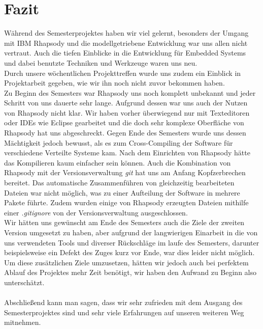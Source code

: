 \chapter{Fazit}

Während des Semesterprojektes haben wir viel gelernt, besonders der Umgang mit IBM Rhapsody und die modellgetriebene Entwicklung war uns allen nicht vertraut. Auch die tiefen Einblicke in die Entwicklung für Embedded Systems und dabei benutzte Techniken und Werkzeuge waren uns neu.\\
Durch unsere wöchentlichen Projekttreffen wurde uns zudem ein Einblick in Projektarbeit gegeben, wie wir ihn noch nicht zuvor bekommen haben.\\
Zu Beginn des Semesters war Rhapsody uns noch komplett unbekannt und jeder Schritt von uns dauerte sehr lange. Aufgrund dessen war uns auch der Nutzen von Rhapsody nicht klar. Wir haben vorher überwiegend nur mit Texteditoren oder IDEs wie Eclipse gearbeitet und die doch sehr komplexe Oberfläche von Rhapsody hat uns abgeschreckt. Gegen Ende des Semesters wurde uns dessen Mächtigkeit jedoch bewusst, als es zum Cross-Compiling der Software für verschiedene Verteilte Systeme kam. Nach dem Einrichten von Rhapsody hätte das Kompilieren kaum einfacher sein können. Auch die Kombination von Rhapsody mit der Versionsverwaltung \textit{git} hat uns am Anfang Kopfzerbrechen bereitet. Das automatische Zusammenführen von gleichzeitig bearbeiteten Dateien war nicht möglich, was zu einer Aufteilung der Software in mehrere Pakete führte. Zudem wurden einige von Rhapsody erzeugten Dateien mithilfe einer \textit{.gitignore} von der Versionsverwaltung ausgeschlossen.\\
Wir hätten uns gewünscht am Ende des Semesters auch die Ziele der zweiten Version umgesetzt zu haben, aber aufgrund der langwierigen Einarbeit in die von uns verwendeten Tools und diverser Rückschläge im laufe des Semesters, darunter beispielsweise ein Defekt des Zuges kurz vor Ende, war dies leider nicht möglich. Um diese zusätzlichen Ziele umzusetzen, hätten wir jedoch auch bei perfektem Ablauf des Projektes mehr Zeit benötigt, wir haben den Aufwand zu Beginn also unterschätzt.\\\\
Abschließend kann man sagen, dass wir sehr zufrieden mit dem Ausgang des Semesterprojektes sind und sehr viele Erfahrungen auf unseren weiteren Weg mitnehmen.